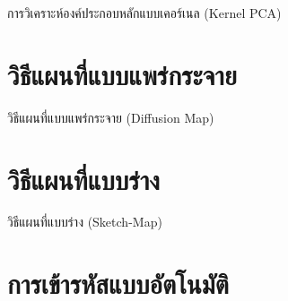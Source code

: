 การวิเคราะห์องค์ประกอบหลักแบบเคอร์เนล (Kernel PCA)

\section{วิธีแผนที่แบบแพร่กระจาย}
\label{sec:diff_map}

วิธีแผนที่แบบแพร่กระจาย (Diffusion Map)

\section{วิธีแผนที่แบบร่าง}
\label{sec:sketch_map}

วิธีแผนที่แบบร่าง (Sketch-Map)

\section{การเข้ารหัสแบบอัตโนมัติ}
\label{sec:autoencoder}

